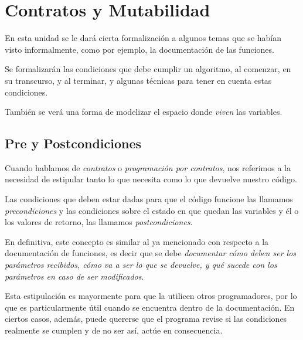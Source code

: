 
%

\chapter{Contratos y Mutabilidad}

En esta unidad se le dará cierta formalización a algunos temas que se habían
visto informalmente, como por ejemplo, la documentación de las funciones.

Se formalizarán las condiciones que debe cumplir un algoritmo, al comenzar, en
su transcurso, y al terminar, y algunas técnicas para tener en cuenta estas
condiciones.

También se verá una forma de modelizar el espacio donde \textit{viven} las
variables.

\section{Pre y Postcondiciones}

Cuando hablamos de \textit{contratos} o \textit{programación por
contratos}, nos referimos a la necesidad de estipular tanto lo que necesita
como lo que devuelve nuestro código.

Las condiciones que deben estar dadas para que el código funcione las llamamos
\emph{precondiciones} y las condiciones sobre el estado en que quedan las
variables y él o los valores de retorno, las llamamos \emph{postcondiciones}.

En definitiva, este concepto es similar al ya mencionado con respecto a la
documentación de funciones, es decir que se debe \emph{documentar cómo deben
ser los parámetros recibidos, cómo va a ser lo que se devuelve, y qué
sucede con los parámetros en caso de ser modificados}.

Esta estipulación es mayormente para que la utilicen otros programadores,
por lo que es particularmente útil cuando se encuentra dentro de la
documentación. En ciertos casos, además, puede quererse que el programa
revise si las condiciones realmente se cumplen y de no ser así, actúe en
consecuencia.

